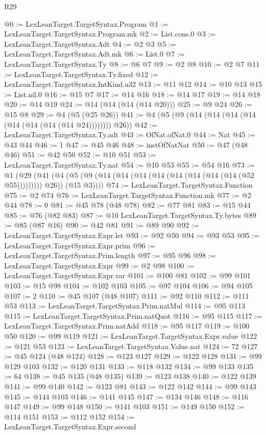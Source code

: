 \begin{lexlean}{R29}
\begin{coremodule}
@0 := LexLeanTarget.TargetSyntax.Program
@1 := LexLeanTarget.TargetSyntax.Program.mk
@2 := List.cons.{0}
@3 := LexLeanTarget.TargetSyntax.Adt
@4 := @2 @3
@5 := LexLeanTarget.TargetSyntax.Adt.mk
@6 := List.{0}
@7 := LexLeanTarget.TargetSyntax.Ty
@8 := @6 @7
@9 := @2 @8
@10 := @2 @7
@11 := LexLeanTarget.TargetSyntax.Ty.fixed
@12 := LexLeanTarget.TargetSyntax.IntKind.u32
@13 := @11 @12
@14 := @10 @13
@15 := List.nil.{0}
@16 := @15 @7
@17 := @14 @16
@18 := @14 @17
@19 := @14 @18
@20 := @14 @19
@24 := @14 (@14 (@14 (@14 @20)))
@25 := @9 @24
@26 := @15 @8
@29 := @4 (@5 (@25 @26))
@41 := @4 (@5 (@9 (@14 (@14 (@14 (@14 (@14 (@14 (@14 (@14 @24)))))))) @26))
@42 := LexLeanTarget.TargetSyntax.Ty.adt
@43 := OfNat.ofNat.{0}
@44 := Nat
@45 := @43 @44
@46 := 1
@47 := @45 @46
@48 := instOfNatNat
@50 := @47 (@48 @46)
@51 := @42 @50
@52 := @10 @51
@53 := LexLeanTarget.TargetSyntax.Ty.nat
@54 := @10 @53
@55 := @54 @16
@73 := @1
    (@29
      (@41 (@4 (@5 (@9 (@14 (@14 (@14 (@14 (@14 (@14 (@14 (@14 (@52 @55))))))))) @26)) (@15 @3))))
@74 := LexLeanTarget.TargetSyntax.Function
@75 := @2 @74
@76 := LexLeanTarget.TargetSyntax.Function.mk
@77 := @2 @44
@78 := 0
@81 := @45 @78 (@48 @78)
@82 := @77 @81
@83 := @15 @44
@85 := @76 (@82 @83)
@87 := @10 LexLeanTarget.TargetSyntax.Ty.bytes
@89 := @85 (@87 @16)
@90 := @42 @81
@91 := @89 @90
@92 := LexLeanTarget.TargetSyntax.Expr.let
@93 := @92 @50
@94 := @93 @53
@95 := LexLeanTarget.TargetSyntax.Expr.prim
@96 := LexLeanTarget.TargetSyntax.Prim.length
@97 := @95 @96
@98 := LexLeanTarget.TargetSyntax.Expr
@99 := @2 @98
@100 := LexLeanTarget.TargetSyntax.Expr.var
@101 := @100 @81
@102 := @99 @101
@103 := @15 @98
@104 := @102 @103
@105 := @97 @104
@106 := @94 @105
@107 := 2
@110 := @45 @107 (@48 @107)
@111 := @92 @110
@112 := @111 @53
@113 := LexLeanTarget.TargetSyntax.Prim.natMul
@114 := @95 @113
@115 := LexLeanTarget.TargetSyntax.Prim.natQuot
@116 := @95 @115
@117 := LexLeanTarget.TargetSyntax.Prim.natAdd
@118 := @95 @117
@119 := @100 @50
@120 := @99 @119
@121 := LexLeanTarget.TargetSyntax.Expr.value
@122 := @121 @53
@123 := LexLeanTarget.TargetSyntax.Value.nat
@124 := 72
@127 := @45 @124 (@48 @124)
@128 := @123 @127
@129 := @122 @128
@131 := @99 @129 @103
@132 := @120 @131
@133 := @118 @132
@134 := @99 @133
@135 := 64
@138 := @45 @135 (@48 @135)
@139 := @123 @138
@140 := @122 @139
@141 := @99 @140
@142 := @123 @81
@143 := @122 @142
@144 := @99 @143
@145 := @144 @103
@146 := @141 @145
@147 := @134 @146
@148 := @116 @147
@149 := @99 @148
@150 := @141 @103
@151 := @149 @150
@152 := @114 @151
@153 := @112 @152
@154 := LexLeanTarget.TargetSyntax.Expr.second

\end{coremodule}
\end{lexlean}
